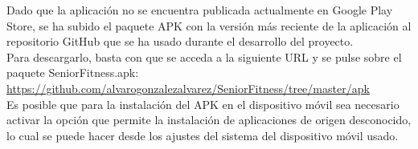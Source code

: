 


Dado que la aplicación no se encuentra publicada actualmente en Google Play Store, se ha subido el paquete APK con la versión más reciente de la aplicación al repositorio GitHub que se ha usado durante el desarrollo del proyecto.\\

Para descargarlo, basta con que se acceda a la siguiente URL y se pulse sobre el paquete SeniorFitness.apk:\\

\url{https://github.com/alvarogonzalezalvarez/SeniorFitness/tree/master/apk}\\

Es posible que para la instalación del APK en el dispositivo móvil sea necesario activar la opción que permite la instalación de aplicaciones de origen desconocido, lo cual se puede hacer desde los ajustes del sistema del dispositivo móvil usado.
